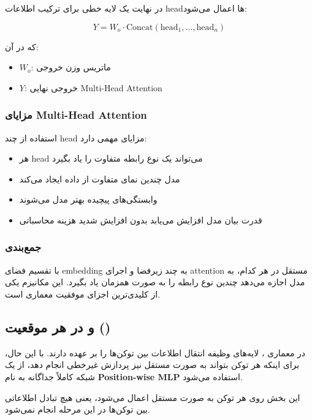 \documentclass{article}
\begin{document}
در نهایت یک لایه خطی برای ترکیب اطلاعات headها اعمال می‌شود:

\[
Y = W_{o} \cdot \text{Concat}(\text{head}_1, \dots, \text{head}_n)
\]

که در آن:

\begin{itemize}
	\item \( W_{o} \): ماتریس وزن خروجی
	\item \( Y \): خروجی نهایی Multi-Head Attention
\end{itemize}

\subsubsection*{مزایای Multi-Head Attention}

استفاده از چند head مزایای مهمی دارد:

\begin{itemize}
	\item هر head می‌تواند یک نوع رابطه متفاوت را یاد بگیرد
	\item مدل چندین نمای متفاوت از داده ایجاد می‌کند
	\item وابستگی‌های پیچیده بهتر مدل می‌شوند
	\item قدرت بیان مدل افزایش می‌یابد بدون افزایش شدید هزینه محاسباتی
\end{itemize}

\subsubsection*{جمع‌بندی}

 با تقسیم فضای embedding به چند زیرفضا و اجرای attention مستقل در هر کدام، به مدل اجازه می‌دهد چندین نوع رابطه را به صورت همزمان یاد بگیرد. این مکانیزم یکی از کلیدی‌ترین اجزای موفقیت معماری  است.

\subsection{ و  در هر موقعیت ()}

در معماری ، لایه‌های  وظیفه انتقال اطلاعات بین توکن‌ها را بر عهده دارند. با این حال، برای اینکه هر توکن بتواند به صورت مستقل نیز پردازش غیرخطی انجام دهد، از یک شبکه کاملاً جداگانه به نام \textbf{Position-wise MLP} استفاده می‌شود.

این بخش روی هر توکن به صورت مستقل اعمال می‌شود، یعنی هیچ تبادل اطلاعاتی بین توکن‌ها در این مرحله انجام نمی‌شود.
\end{document}

